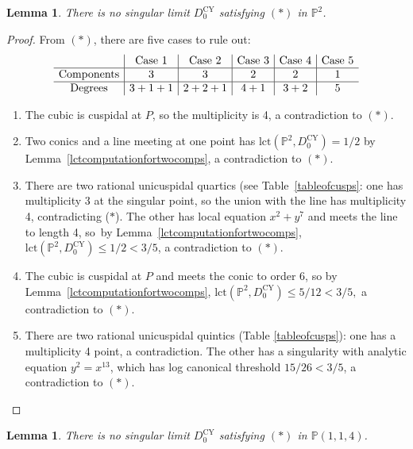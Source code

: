 \documentclass[JEP,XML,SOM,Unicode,NoFloatCountersInSection,published]{cedram}
\theoremstyle{plain}
\newtheorem{lemma}[theorem]{Lemma}
\theoremstyle{definition}
\newcommand\PP{{\mathbb{P}}}
\newcommand\lct{\mathrm{lct}}
\newcommand\Dcyo{{D^{\mathrm{CY}}_0}}
\begin{document}
\begin{lemma}\label{p2quintics}
There is no singular limit $\Dcyo$ satisfying $(\ast)$ in $\PP^2$.
\end{lemma}

\begin{proof}
From $(\ast)$, there are five cases to rule out:\smaller
\[\arraycolsep4.5pt
\begin{array}[t]{c|c|c|c|c|c}
&\text{Case 1}&\text{Case 2}&\text{Case 3}&\text{Case 4}&\text{Case 5}\\
\hline
\text{Components}&3&3&2&2&1\\
\hline
\text{Degrees}&3+1+1&2+2+1&4+1&3+2&5
\end{array}
\]\larger
\begin{enumerate}
\item[(Case 1)] The cubic is cuspidal at $P$, so the multiplicity is 4, a contradiction to $(\ast)$.
\item[(Case 2)] Two conics and a line meeting at one point has $\lct(\PP^2,\Dcyo) = 1/2$ by Lemma~\ref{lctcomputationfortwocomps}, a contradiction to $(\ast)$.
\item[(Case 3)] There are two rational unicuspidal quartics (see Table~\ref{tableofcusps}: one has multiplicity 3 at the singular point, so the union with the line has multiplicity 4, contradicting ($\ast$). The other has local equation $x^2+y^7$ and meets the line to length 4, so~by Lemma~\ref{lctcomputationfortwocomps}, $\lct(\PP^2,\Dcyo)\le 1/2<3/5$, a contradiction to $(\ast)$.
\item[(Case 4)] The cubic is cuspidal at $P$ and meets the conic to order 6, so by Lem\-ma~\ref{lctcomputationfortwocomps}, $\lct(\PP^2,\Dcyo)\le 5/12<3/5,$ a contradiction to $(\ast)$.
\item[(Case 5)] There are two rational unicuspidal quintics (Table \ref{tableofcusps}): one has a multiplicity 4 point, a contradiction. The other has a singularity with analytic equation $y^2=x^{13}$, which has log canonical threshold $15/26<3/5$, a contradiction to $(\ast)$.\qedhere
\end{enumerate}
\end{proof}

\begin{lemma}\label{p114quintics}
There is no singular limit $\Dcyo$ satisfying $(\ast)$ in $\PP(1,1,4)$.
\end{lemma}
\end{document}
